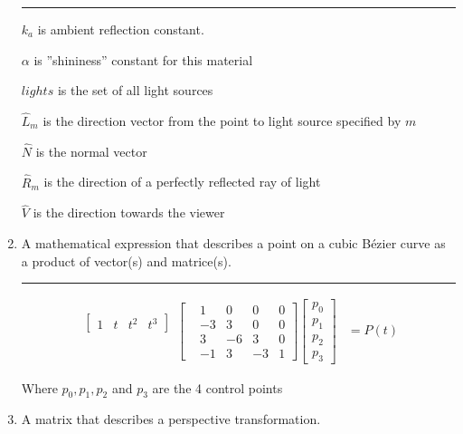 \documentclass[oneside]{article}
\newenvironment{answer}
  {\vspace*{0.2cm} \rule{12cm}{0.02cm} \vspace*{0.2cm}}
  {\vspace*{0.2cm}}
\begin{document}
\begin{enumerate}
\begin{answer}
	      	$k_a$ is  ambient reflection constant.

	      	$\alpha$ is ''shininess'' constant for this material

	      	$lights$ is the set of all light sources

	      	$\hat{L}_m$ is the direction vector from the point to light source specified by $m$

	      	$\hat{N}$ is the normal vector

	      	$\hat{R}_m$ is the direction of a perfectly reflected ray of light

	      	$\hat{V}$ is the direction towards the viewer
	      \end{answer}

	\item A mathematical expression that describes a point on a cubic B\'{e}zier curve as a product of vector(s) and matrice(s).

	      \begin{answer}
	      	\begin{align*}
	      		\begin{matrix}
	      		\begin{bmatrix}
	      		1  & t  & t^2 & t^3
	      		\end{bmatrix} \\
	      		\mbox{} \\
	      		\mbox{} \\
	      		\mbox{}
	      		\end{matrix}
	      		\begin{bmatrix}
	      		  & 1  & 0  & 0  & 0 \\
	      		  & -3 & 3  & 0  & 0 \\
	      		  & 3  & -6 & 3  & 0 \\
	      		  & -1 & 3  & -3 & 1
	      		\end{bmatrix}
	      		\begin{bmatrix}
	      		p_0 \\
	      		p_1 \\
	      		p_2 \\
	      		p_3
	      		\end{bmatrix}
	      		& = P(t)
	      	\end{align*}

	      	Where $p_0, p_1, p_2$ and $p_3$ are the 4 control points
	      \end{answer}

	\item A matrix that describes a perspective transformation.


\end{enumerate}
\end{document}
